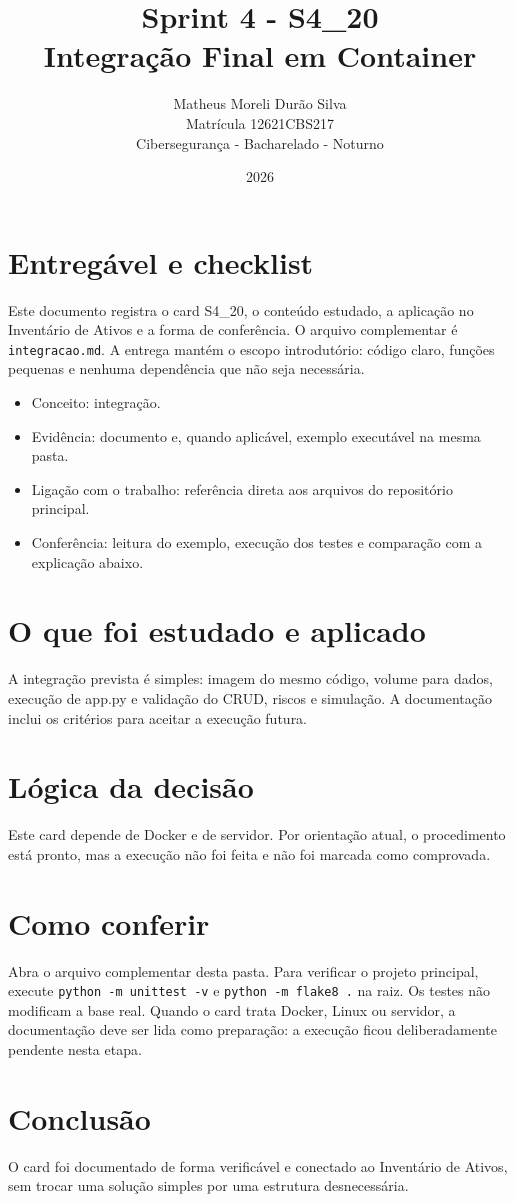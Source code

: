 \documentclass[12pt]{article}
\title{Sprint 4 - S4\_20\\Integração Final em Container}
\author{Matheus Moreli Durão Silva\\ Matrícula 12621CBS217\\ Cibersegurança - Bacharelado - Noturno}
\date{2026}
\begin{document}
\maketitle

\section*{Entregável e checklist}
Este documento registra o card S4\_20, o conteúdo estudado, a aplicação no Inventário de Ativos e a forma de conferência. O arquivo complementar é \texttt{integracao.md}. A entrega mantém o escopo introdutório: código claro, funções pequenas e nenhuma dependência que não seja necessária.

\begin{itemize}
\item Conceito: integração.
\item Evidência: documento e, quando aplicável, exemplo executável na mesma pasta.
\item Ligação com o trabalho: referência direta aos arquivos do repositório principal.
\item Conferência: leitura do exemplo, execução dos testes e comparação com a explicação abaixo.
\end{itemize}

\section*{O que foi estudado e aplicado}
A integração prevista é simples: imagem do mesmo código, volume para dados, execução de app.py e validação do CRUD, riscos e simulação. A documentação inclui os critérios para aceitar a execução futura.

\section*{Lógica da decisão}
Este card depende de Docker e de servidor. Por orientação atual, o procedimento está pronto, mas a execução não foi feita e não foi marcada como comprovada.

\section*{Como conferir}
Abra o arquivo complementar desta pasta. Para verificar o projeto principal, execute \texttt{python -m unittest -v} e \texttt{python -m flake8 .} na raiz. Os testes não modificam a base real. Quando o card trata Docker, Linux ou servidor, a documentação deve ser lida como preparação: a execução ficou deliberadamente pendente nesta etapa.

\section*{Conclusão}
O card foi documentado de forma verificável e conectado ao Inventário de Ativos, sem trocar uma solução simples por uma estrutura desnecessária.
\end{document}
